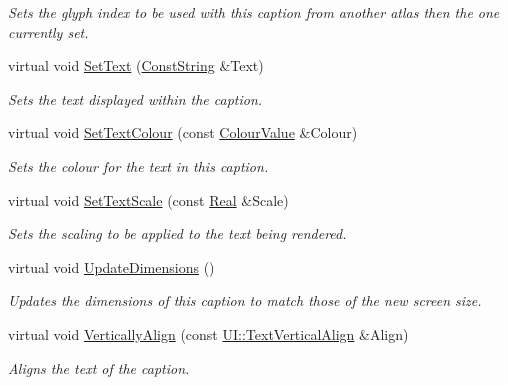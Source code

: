 \begin{DoxyCompactItemize}
\begin{DoxyCompactList}\small\item\em Sets the glyph index to be used with this caption from another atlas then the one currently set. \item\end{DoxyCompactList}\item 
virtual void \hyperlink{classMezzanine_1_1UI_1_1Caption_aa47e6ddbe4b6181d4d2e963360866a43}{SetText} (\hyperlink{namespaceMezzanine_a63cd699ac54b73953f35ec9cfc05e506}{ConstString} \&Text)
\begin{DoxyCompactList}\small\item\em Sets the text displayed within the caption. \item\end{DoxyCompactList}\item 
virtual void \hyperlink{classMezzanine_1_1UI_1_1Caption_a9c25c8813d05c59d09d7c62599dce50a}{SetTextColour} (const \hyperlink{classMezzanine_1_1ColourValue}{ColourValue} \&Colour)
\begin{DoxyCompactList}\small\item\em Sets the colour for the text in this caption. \item\end{DoxyCompactList}\item 
virtual void \hyperlink{classMezzanine_1_1UI_1_1Caption_a26b5af3af19440f274a7938806043ca7}{SetTextScale} (const \hyperlink{namespaceMezzanine_a726731b1a7df72bf3583e4a97282c6f6}{Real} \&Scale)
\begin{DoxyCompactList}\small\item\em Sets the scaling to be applied to the text being rendered. \item\end{DoxyCompactList}\item 
virtual void \hyperlink{classMezzanine_1_1UI_1_1Caption_ab6c528d41fb194d19b2ec426a9d95db7}{UpdateDimensions} ()
\begin{DoxyCompactList}\small\item\em Updates the dimensions of this caption to match those of the new screen size. \item\end{DoxyCompactList}\item 
virtual void \hyperlink{classMezzanine_1_1UI_1_1Caption_aa6b18dfcd49114eee5e785971c1c9440}{VerticallyAlign} (const \hyperlink{namespaceMezzanine_1_1UI_ab35e3845e2541698245262cc17147ae9}{UI::TextVerticalAlign} \&Align)
\begin{DoxyCompactList}\small\item\em Aligns the text of the caption. \item\end{DoxyCompactList}\end{DoxyCompactItemize}
